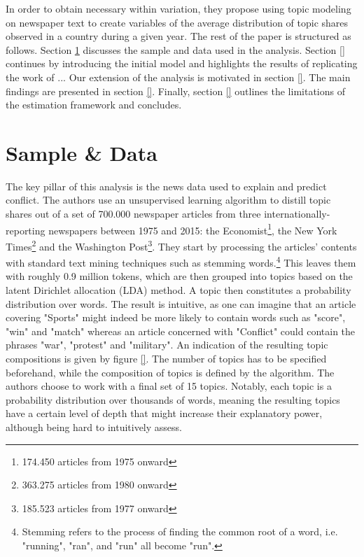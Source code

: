In order to obtain necessary within variation, they propose using topic modeling on newspaper text to create variables of the average distribution of topic shares observed in a country during a given year.
The rest of the paper is structured as follows.
Section \ref{sec:data} discusses the sample and data used in the analysis.
Section \ref{} continues by introducing the initial model and highlights the results of replicating the work of ...
Our extension of the analysis is motivated in section \ref{}.
The main findings are presented in section \ref{}.
Finally, section \ref{} outlines the limitations of the estimation framework and concludes.




\section{Sample \& Data} \label{sec:data}
The key pillar of this analysis is the news data used to explain and predict conflict.
The authors use an unsupervised learning algorithm to distill topic shares out of a set of 700.000 newspaper articles from three internationally-reporting newspapers between 1975 and 2015: the Economist\footnote{174.450 articles from 1975 onward}, the New York Times\footnote{363.275 articles from 1980 onward} and the Washington Post\footnote{185.523 articles from 1977 onward}.
They start by processing the articles' contents with standard text mining techniques such as stemming words.\footnote{Stemming refers to the process of finding the common root of a word, i.e. "running", "ran", and "run" all become "run".}
This leaves them with roughly 0.9 million tokens, which are then grouped into topics based on the latent Dirichlet allocation (LDA) method.
A topic then constitutes a probability distribution over words.
The result is intuitive, as one can imagine that an article covering "Sports" might indeed be more likely to contain words such as "score", "win" and "match" whereas an article concerned with "Conflict" could contain the phrases "war", "protest" and "military".
An indication of the resulting topic compositions is given by figure \ref{}.
The number of topics has to be specified beforehand, while the composition of topics is defined by the algorithm.
The authors choose to work with a final set of 15 topics.
Notably, each topic is a probability distribution over thousands of words, meaning the resulting topics have a certain level of depth that might increase their explanatory power, although being hard to intuitively assess.

